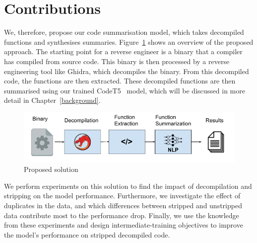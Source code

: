 \section{Contributions}
We, therefore, propose our code summarisation model, which takes decompiled functions and synthesises summaries. Figure~\ref{fig:useCase} shows an overview of the proposed approach. The starting point for a reverse engineer is a binary that a compiler has compiled from source code. This binary is then processed by a reverse engineering tool like Ghidra, which decompiles the binary. From this decompiled code, the functions are then extracted. These decompiled functions are then summarised using our trained CodeT5~\cite{CodeT5} model, which will be discussed in more detail in Chapter~\ref{background}.

\begin{figure}[tbh]
    \centering
    \includegraphics[width=\textwidth,height=\textheight,keepaspectratio]{img/UseCase.png}
    \caption{Proposed solution}
    \label{fig:useCase}
\end{figure}

We perform experiments on this solution to find the impact of decompilation and stripping on the model performance. Furthermore, we investigate the effect of duplicates in the data, and which differences between stripped and unstripped data contribute most to the performance drop. Finally, we use the knowledge from these experiments and design intermediate-training objectives to improve the model's performance on stripped decompiled code.\\

